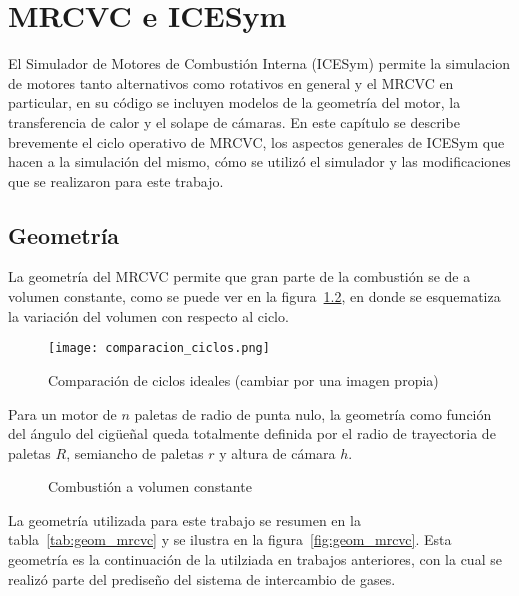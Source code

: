 \chapter{MRCVC e ICESym}\label{ch:mrcvc}

El Simulador de Motores de Combustión Interna (ICESym) permite la simulacion de
motores tanto alternativos como rotativos en general y el MRCVC en particular,
en su código se incluyen modelos de la geometría del motor, la transferencia de
calor y el solape de cámaras.
%
En este capítulo se describe brevemente el ciclo operativo de MRCVC, los
aspectos generales de ICESym que hacen a la simulación del mismo, cómo se
utilizó el simulador y las modificaciones que se realizaron para este trabajo.


\section{Geometría}
%
La geometría del MRCVC permite que gran parte de la combustión se de a volumen
constante\cite{mrcvc_geom}, como se puede ver en la figura~\ref{fig:vol_constante},
en donde se esquematiza la variación del volumen con respecto al ciclo.

\begin{figure}
    \centering
    \texttt{[image: comparacion\_ciclos.png]}
    \caption{Comparación de ciclos ideales (cambiar por una imagen propia)}\label{fig:comparacion_ciclos}
\end{figure}


Para un motor de $n$ paletas de radio de punta nulo, la geometría como función
del ángulo del cigüeñal queda totalmente definida por el radio de trayectoria de
paletas $R$, semiancho de paletas $r$ y altura de cámara $h$.

\begin{figure}
    \centering
    \caption{Combustión a volumen constante}\label{fig:vol_constante}
\end{figure}

La geometría utilizada para este trabajo se resumen en la
tabla~\ref{tab:geom_mrcvc} y se ilustra en la figura~\ref{fig:geom_mrcvc}.
%
Esta geometría es la continuación de la utilziada en trabajos anteriores, con la
cual se realizó parte del prediseño del sistema de intercambio de gases.


